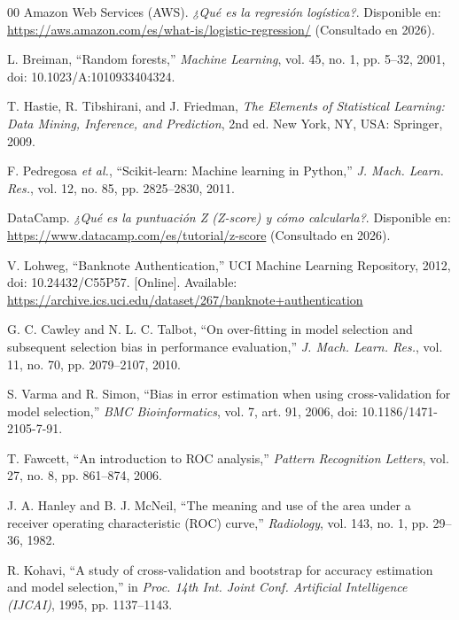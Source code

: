 \documentclass[conference]{IEEEtran}
\begin{document}
	\begin{thebibliography}{00}
    	Amazon Web Services (AWS). 
    	\textit{¿Qué es la regresión logística?}. 
    	Disponible en: \url{https://aws.amazon.com/es/what-is/logistic-regression/} (Consultado en 2026).
    	
    	L. Breiman, ``Random forests,'' \textit{Machine Learning}, vol. 45, no. 1, pp. 5--32, 2001, doi: 10.1023/A:1010933404324.
    	
    	T. Hastie, R. Tibshirani, and J. Friedman, \textit{The Elements of Statistical Learning: Data Mining, Inference, and Prediction}, 2nd ed. New York, NY, USA: Springer, 2009.
    	
    	F. Pedregosa \textit{et al.}, ``Scikit-learn: Machine learning in Python,'' \textit{J. Mach. Learn. Res.}, vol. 12, no. 85, pp. 2825--2830, 2011.
    	
    	DataCamp. 
    	\textit{¿Qué es la puntuación Z (Z-score) y cómo calcularla?}. 
    	Disponible en: \url{https://www.datacamp.com/es/tutorial/z-score} (Consultado en 2026).
    	
    	V. Lohweg, ``Banknote Authentication,'' UCI Machine Learning Repository, 2012, doi: 10.24432/C55P57. [Online]. Available: \url{https://archive.ics.uci.edu/dataset/267/banknote+authentication}
    	
    	G. C. Cawley and N. L. C. Talbot, ``On over-fitting in model selection and subsequent selection bias in performance evaluation,'' \textit{J. Mach. Learn. Res.}, vol. 11, no. 70, pp. 2079--2107, 2010.
    	
    	S. Varma and R. Simon, ``Bias in error estimation when using cross-validation for model selection,'' \textit{BMC Bioinformatics}, vol. 7, art. 91, 2006, doi: 10.1186/1471-2105-7-91.
    	
    	T. Fawcett, ``An introduction to ROC analysis,'' \textit{Pattern Recognition Letters}, vol. 27, no. 8, pp. 861--874, 2006.
    	
    	J. A. Hanley and B. J. McNeil, ``The meaning and use of the area under a receiver operating characteristic (ROC) curve,'' \textit{Radiology}, vol. 143, no. 1, pp. 29--36, 1982.
    	
    	R. Kohavi, ``A study of cross-validation and bootstrap for accuracy estimation and model selection,'' in \textit{Proc. 14th Int. Joint Conf. Artificial Intelligence (IJCAI)}, 1995, pp. 1137--1143.
    	

\end{thebibliography}
\end{document}
